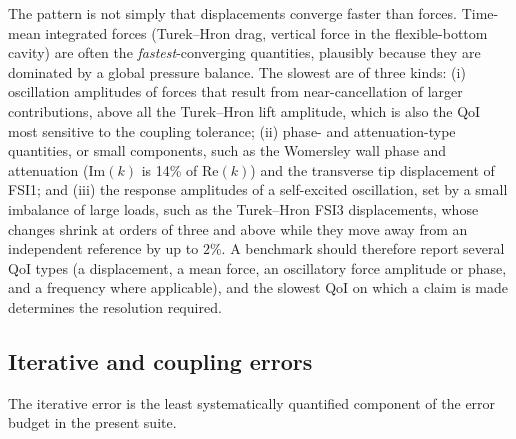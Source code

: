 The pattern is not simply that displacements converge faster than forces.
Time-mean integrated forces (Turek--Hron drag, vertical force in the flexible-bottom cavity) are often the \emph{fastest}-converging quantities, plausibly because they are dominated by a global pressure balance.
The slowest are of three kinds:
(i) oscillation amplitudes of forces that result from near-cancellation of larger contributions, above all the Turek--Hron lift amplitude, which is also the QoI most sensitive to the coupling tolerance;
(ii) phase- and attenuation-type quantities, or small components, such as the Womersley wall phase and attenuation ($\mathrm{Im}(k)$ is 14\% of $\mathrm{Re}(k)$) and the transverse tip displacement of FSI1; and
(iii) the response amplitudes of a self-excited oscillation, set by a small imbalance of large loads, such as the Turek--Hron FSI3 displacements, whose changes shrink at orders of three and above while they move away from an independent reference by up to $2\%$.
A benchmark should therefore report several QoI types (a displacement, a mean force, an oscillatory force amplitude or phase, and a frequency where applicable), and the slowest QoI on which a claim is made determines the resolution required.

\subsection{Iterative and coupling errors}\label{sec:iterative_errors}

The iterative error is the least systematically quantified component of the error budget in the present suite.

